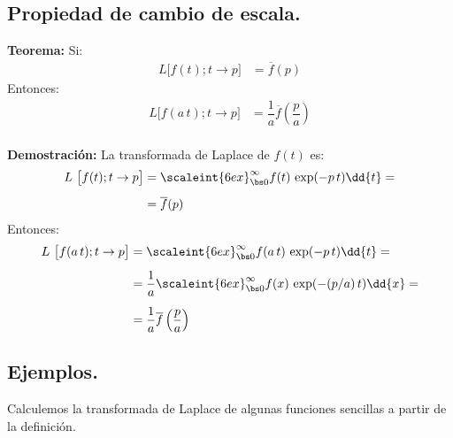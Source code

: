 \subsection{Propiedad de cambio de escala.}

\noindent \textbf{Teorema: } Si:
\begin{align*}
L \big[  f (t); t \to p  \big] &= \overline{f} (p)
\end{align*}
Entonces:
\begin{align*}
L \big[  f (a \, t); t \to p  \big] &= \dfrac{1}{a}\overline{f} \left(\dfrac{p}{a}\right)
\end{align*}
\\[0.5em]
\textbf{Demostración: } La transformada de Laplace de $f (t)$ es:
\begin{align*}
L \big[  f (t); t \to p  \big] &= \scaleint{6ex}_{\bs 0}^{\infty} f (t) \, \exp(-p \, t) \dd{t} = \\[0.5em]
&= \overline{f} (p)
\end{align*}
Entonces:
\begin{align}
\begin{aligned}[b]
L \big[  f(a \, t); t \to p  \big] &= \scaleint{6ex}_{\bs 0}^{\infty} f (a \, t) \, \exp(-p \, t) \dd{t} = \\[0.5em]
&= \dfrac{1}{a} \scaleint{6ex}_{\bs 0}^{\infty} f (x) \, \exp(- (p/a) \, t) \dd{x} = \\[0.5em]
&= \dfrac{1}{a}\overline{f} \left(\dfrac{p}{a}\right)
\end{aligned}
\label{eq:ecuacion_03_09}
\end{align}

\subsection*{Ejemplos.}

Calculemos la transformada de Laplace de algunas funciones sencillas a partir de la definición.


